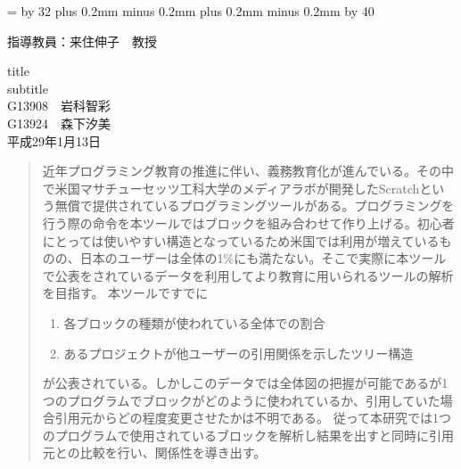 \documentclass[a4paper,10pt,onecolumn,oneside,openany]{jsbook}
\def\linesparpage#1{\baselineskip=\textheight
   \divide\baselineskip by #1}
\def\kcharparline#1{%
   \ifx\xkanjiskip\undefined%
   \jintercharskip 0mm plus 0.2mm minus 0.2mm
   \else
   \xkanjiskip 0mm plus 0.2mm minus 0.2mm
   \fi
   \settowidth{\textwidth}{あ}%
   \multiply\textwidth by #1}
\begin{document}
\linesparpage{32} %
\kcharparline{40} %
\begin{titlepage}
\begin{flushright}
{\large
指導教員：来住伸子　教授 \\ %
}
\end{flushright}
\begin{center}
\vspace{150truept}
{\huge title}\\ %
\vspace{10truept}
{\Large subtitle}\\ %
\vspace{50truept}
{\huge G13908　岩科智彩}\\ %
\vspace{10truept}
{\huge G13924　森下汐美}\\ %
\vspace{50truept}
{\huge 平成29年1月13日}\\ %
\end{center}
\end{titlepage}

\frontmatter
\begin{abstract} %
近年プログラミング教育の推進に伴い、義務教育化が進んでいる。その中で米国マサチューセッツ工科大学のメディアラボが開発したScratchという無償で提供されているプログラミングツールがある。プログラミングを行う際の命令を本ツールではブロックを組み合わせて作り上げる。初心者にとっては使いやすい構造となっているため米国では利用が増えているものの、日本のユーザーは全体の1\%にも満たない。そこで実際に本ツールで公表をされているデータを利用してより教育に用いられるツールの解析を目指す。
本ツールですでに
\begin{enumerate}
  \item 各ブロックの種類が使われている全体での割合
  \item あるプロジェクトが他ユーザーの引用関係を示したツリー構造
\end{enumerate}
が公表されている。しかしこのデータでは全体図の把握が可能であるが1つのプログラムでブロックがどのように使われているか、引用していた場合引用元からどの程度変更させたかは不明である。
従って本研究では1つのプログラムで使用されているブロックを解析し結果を出すと同時に引用元との比較を行い、関係性を導き出す。
\end{abstract}

\tableofcontents
%
%
\mainmatter
%
\end{document}
